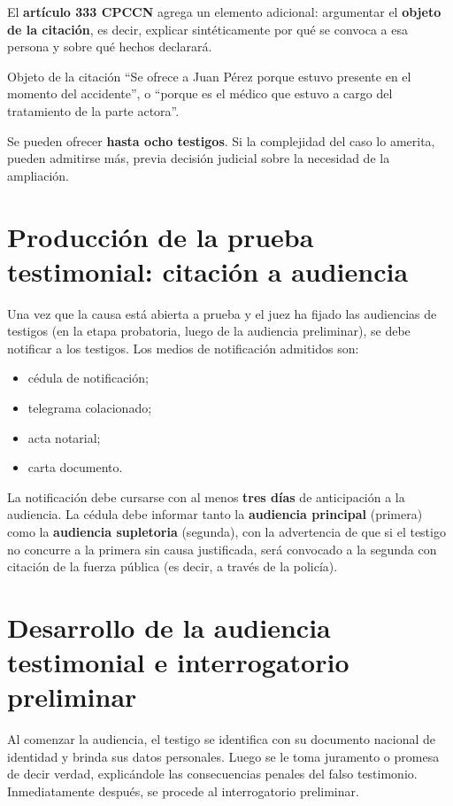 \documentclass[12pt,oneside]{book}
\begin{document}
El \textbf{artículo 333 CPCCN} agrega un elemento adicional: argumentar el \textbf{objeto de la citación}, es decir, explicar sintéticamente por qué se convoca a esa persona y sobre qué hechos declarará.

\begin{example}{Objeto de la citación}
``Se ofrece a Juan Pérez porque estuvo presente en el momento del accidente'', o ``porque es el médico que estuvo a cargo del tratamiento de la parte actora''.
\end{example}

Se pueden ofrecer \textbf{hasta ocho testigos}. Si la complejidad del caso lo amerita, pueden admitirse más, previa decisión judicial sobre la necesidad de la ampliación.

\section{Producción de la prueba testimonial: citación a audiencia}

Una vez que la causa está abierta a prueba y el juez ha fijado las audiencias de testigos (en la etapa probatoria, luego de la audiencia preliminar), se debe notificar a los testigos. Los medios de notificación admitidos son:
\begin{itemize}
    \item cédula de notificación;
    \item telegrama colacionado;
    \item acta notarial;
    \item carta documento.
\end{itemize}

La notificación debe cursarse con al menos \textbf{tres días} de anticipación a la audiencia. La cédula debe informar tanto la \textbf{audiencia principal} (primera) como la \textbf{audiencia supletoria} (segunda), con la advertencia de que si el testigo no concurre a la primera sin causa justificada, será convocado a la segunda con citación de la fuerza pública (es decir, a través de la policía).

\section{Desarrollo de la audiencia testimonial e interrogatorio preliminar}

Al comenzar la audiencia, el testigo se identifica con su documento nacional de identidad y brinda sus datos personales. Luego se le toma juramento o promesa de decir verdad, explicándole las consecuencias penales del falso testimonio. Inmediatamente después, se procede al interrogatorio preliminar.
\end{document}
